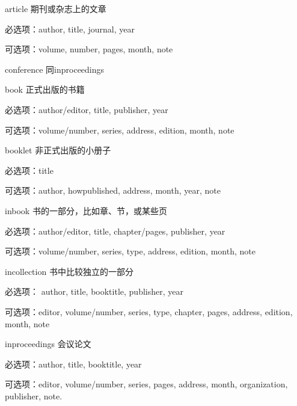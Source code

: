 \begin{compactdesc}
  \item [article] 期刊或杂志上的文章
    \begin{compactitem}
      \item 必选项：author, title, journal, year
      \item 可选项：volume, number, pages, month, note
    \end{compactitem}
  \item [conference] 同inproceedings
  \item [book] 正式出版的书籍
    \begin{compactitem}
      \item 必选项：author/editor, title, publisher, year
      \item 可选项：volume/number, series, address, edition, month, note
    \end{compactitem}
  \item [booklet] 非正式出版的小册子
    \begin{compactitem}
      \item 必选项：title
      \item 可选项：author, howpublished, address, month, year, note
    \end{compactitem}
  \item [inbook] 书的一部分，比如章、节，或某些页
    \begin{compactitem}
      \item 必选项：author/editor, title, chapter/pages, publisher, year
      \item 可选项：volume/number, series, type, address, edition, month, note
    \end{compactitem}
  \item [incollection] 书中比较独立的一部分
    \begin{compactitem}
      \item 必选项： author, title, booktitle, publisher, year 
      \item 可选项：editor, volume/number, series, type, chapter, pages, address, edition, month, note
    \end{compactitem}
  \item [inproceedings] 会议论文
    \begin{compactitem}
      \item 必选项：author, title, booktitle, year
      \item 可选项：editor, volume/number, series, pages, address, month,  organization, publisher, note.
    \end{compactitem}

\end{compactdesc}
